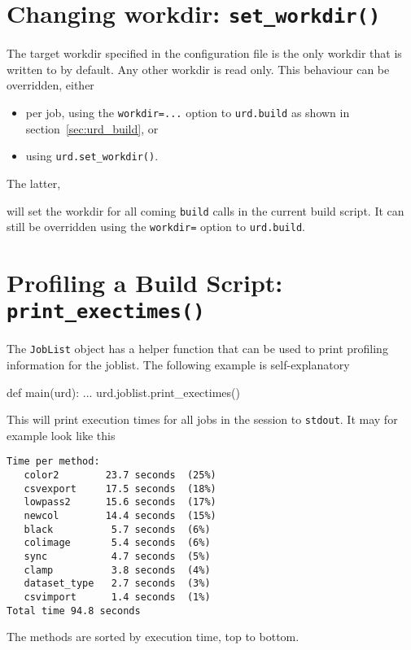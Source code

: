 \section{Changing workdir:  \texttt{set\_workdir()}}
\label{sec:set_workdir}
The target workdir specified in the configuration file is the only
workdir that is written to by default.  Any other workdir is read
only.  This behaviour can be overridden, either
\begin{itemize}
\item[] per job, using the \texttt{workdir=...} option to \texttt{urd.build} as shown in section~\ref{sec:urd_build}, or
\item[] using \texttt{urd.set\_workdir()}.
\end{itemize}
The latter,
\begin{python}
def main(urd):
    urd.set_workdir(<workdir>)}
\end{python}
will set the workdir for all coming \texttt{build} calls in the
current build script.  It can still be overridden using
the \texttt{workdir=} option to \texttt{urd.build}.





\section{Profiling a Build Script:  \texttt{print\_exectimes()}}
The \texttt{JobList} object has a helper function that can be used to
print profiling information for the joblist.  The following example is
self-explanatory
\begin{python}
def main(urd):
    ...
    urd.joblist.print_exectimes()
\end{python}
This will print execution times for all jobs in the session
to \texttt{stdout}.  It may for example look like this
\begin{verbatim}
Time per method:
   color2        23.7 seconds  (25%)
   csvexport     17.5 seconds  (18%)
   lowpass2      15.6 seconds  (17%)
   newcol        14.4 seconds  (15%)
   black          5.7 seconds  (6%)
   colimage       5.4 seconds  (6%)
   sync           4.7 seconds  (5%)
   clamp          3.8 seconds  (4%)
   dataset_type   2.7 seconds  (3%)
   csvimport      1.4 seconds  (1%)
Total time 94.8 seconds
\end{verbatim}
The methods are sorted by execution time, top to bottom.





